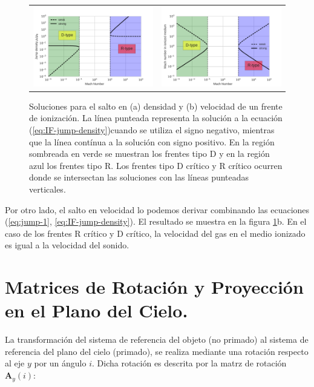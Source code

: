 \begin{figure}
  \begin{tabular}{lr}
    \includegraphics[width=0.5\linewidth]{./Figures/IF-types} &
    \includegraphics[width=0.5\linewidth]{./Figures/IF-vel-jump}
  \end{tabular}
  \caption{Soluciones para el salto en (a) densidad y (b) velocidad de un frente de ionización. La línea punteada representa la solución a la ecuación (\ref{eq:IF-jump-density})cuando se utiliza el signo negativo, mientras que la línea contínua a la solución con signo positivo. En la región sombreada en verde se muestran los frentes tipo D y en la región azul los frentes tipo R. Los frentes tipo D crítico y R crítico ocurren donde se intersectan las soluciones con las líneas punteadas verticales.}
  \label{fig:IF-jump}
\end{figure}
Por otro lado, el salto en velocidad lo podemos derivar combinando las ecuaciones (\ref{eq:jump-1}, \ref{eq:IF-jump-density}). El resultado se muestra en la figura \ref{fig:IF-jump}b. En el caso de los frentes R crítico y D crítico, la velocidad del gas en el medio ionizado es igual a la velocidad del sonido.

\chapter[Matrices de Rotación]{Matrices de Rotación y Proyección en el Plano del Cielo.}
\label{app:matrix}
\thispagestyle{empty}
La transformación del sistema de referencia del objeto (no primado) al sistema de referencia del plano del cielo (primado), se realiza mediante una rotación respecto al eje $y$ por un ángulo $i$. Dicha rotación es descrita por la matrz de rotación $\mathbf{A}_y(i)$:

